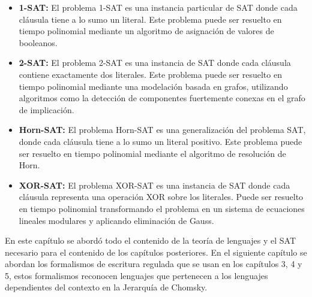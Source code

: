 \begin{itemize}
      \item \textbf{1-SAT:} El problema 1-SAT es una instancia particular de SAT donde cada cláusula tiene a lo sumo un literal.
            Este problema puede ser resuelto en tiempo polinomial mediante un algoritmo de asignación de valores de booleanos.
            
      \item \textbf{2-SAT:} El problema 2-SAT es una instancia de SAT donde cada cláusula contiene exactamente dos literales.
            Este problema puede ser resuelto en tiempo polinomial mediante una modelación basada en grafos, 
            utilizando algoritmos como la detección de componentes fuertemente conexas en el grafo de implicación.
            
      \item \textbf{Horn-SAT:} El problema Horn-SAT es una generalización del problema SAT,
            donde cada cláusula tiene a lo sumo un literal positivo. 
            Este problema puede ser resuelto en tiempo polinomial mediante el algoritmo de resolución de Horn.
            
      \item \textbf{XOR-SAT:} El problema XOR-SAT es una instancia de SAT donde cada cláusula representa una operación XOR
            sobre los literales. Puede ser resuelto en tiempo polinomial transformando el problema en un sistema de ecuaciones 
            lineales modulares y aplicando eliminación de Gauss.
\end{itemize}

En este capítulo se abordó todo el contenido de la teoría de lenguajes y el SAT necesario para el contenido de los capítulos posteriores.
En el siguiente capítulo se abordan los formalismos de escritura regulada que se usan en los capítulos 3, 4 y 5, estos formalismos reconocen lenguajes
que pertenecen a los lenguajes dependientes del contexto en la Jerarquía de Chomsky.